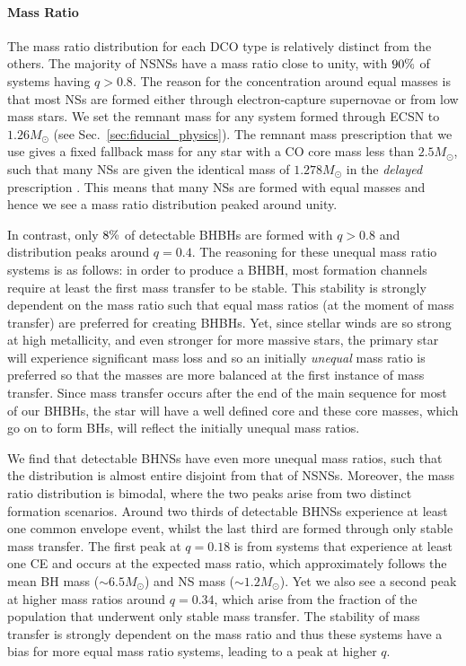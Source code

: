 \paragraph{Mass Ratio} The mass ratio distribution for each DCO type is relatively distinct from the others. The majority of NSNSs have a mass ratio close to unity, with $90\%{}$ of systems having $q > 0.8$. The reason for the concentration around equal masses is that most NSs are formed either through electron-capture supernovae or from low mass stars. We set the remnant mass for any system formed through ECSN to $1.26 \unit{M_{\odot}}$ (see Sec.~\ref{sec:fiducial_physics}). The remnant mass prescription that we use gives a fixed fallback mass for any star with a CO core mass less than $2.5 \unit{M_\odot}$, such that many NSs are given the identical mass of $1.278 \unit{M_\odot}$ in the \textit{delayed} prescription \citep[see][Eq.~19]{Fryer+2012}. This means that many NSs are formed with equal masses and hence we see a mass ratio distribution peaked around unity.

In contrast, only $8\%{}$ of detectable BHBHs are formed with $q > 0.8$ and distribution peaks around $q = 0.4$. The reasoning for these unequal mass ratio systems is as follows: in order to produce a BHBH, most formation channels require at least the first mass transfer to be stable. This stability is strongly dependent on the mass ratio such that equal mass ratios (at the moment of mass transfer) are preferred for creating BHBHs. Yet, since stellar winds are so strong at high metallicity, and even stronger for more massive stars, the primary star will experience significant mass loss and so an initially \textit{unequal} mass ratio is preferred so that the masses are more balanced at the first instance of mass transfer. Since mass transfer occurs after the end of the main sequence for most of our BHBHs, the star will have a well defined core and these core masses, which go on to form BHs, will reflect the initially unequal mass ratios.

We find that detectable BHNSs have even more unequal mass ratios, such that the distribution is almost entire disjoint from that of NSNSs. Moreover, the mass ratio distribution is bimodal, where the two peaks arise from two distinct formation scenarios. Around two thirds of detectable BHNSs experience at least one common envelope event, whilst the last third are formed through only stable mass transfer. The first peak at $q = 0.18$ is from systems that experience at least one CE and occurs at the expected mass ratio, which approximately follows the mean BH mass ($\sim 6.5 \unit{M_\odot}$) and NS mass ($\sim 1.2 \unit{M_\odot}$). Yet we also see a second peak at higher mass ratios around $q = 0.34$, which arise from the fraction of the population that underwent only stable mass transfer. The stability of mass transfer is strongly dependent on the mass ratio and thus these systems have a bias for more equal mass ratio systems, leading to a peak at higher $q$.

